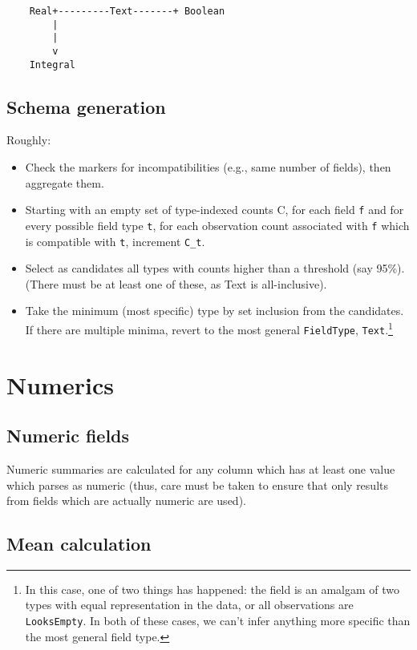 \documentclass[a4paper]{article}
\begin{document}
\begin{verbatim}
    Real+---------Text-------+ Boolean
        |
        |
        v
    Integral
\end{verbatim}

\subsection{Schema generation}\label{schema-generation}

Roughly:

\begin{itemize}
\item
  Check the markers for incompatibilities (e.g., same number of fields),
  then aggregate them.
\item
  Starting with an empty set of type-indexed counts C, for each field
  \texttt{f} and for every possible field type \texttt{t}, for each
  observation count associated with \texttt{f} which is compatible with
  \texttt{t}, increment \texttt{C\_t}.
\item
  Select as candidates all types with counts higher than a threshold
  (say 95\%). (There must be at least one of these, as Text is
  all-inclusive).
\item
  Take the minimum (most specific) type by set inclusion from the
  candidates. If there are multiple minima, revert to the most general
  \texttt{FieldType}, \texttt{Text}.\footnote{In this case, one of two
    things has happened: the field is an amalgam of two types with
    equal representation in the data, or all observations are
    \texttt{LooksEmpty}. In both of these cases, we can't infer
    anything more specific than the most general field type.}
\end{itemize}

\section{Numerics}\label{numerics}

\subsection{Numeric fields}\label{numeric-fields}

Numeric summaries are calculated for any column which has at least one
value which parses as numeric (thus, care must be taken to ensure that
only results from fields which are actually numeric are used).

\subsection{Mean calculation}\label{mean-calculation}
\end{document}

